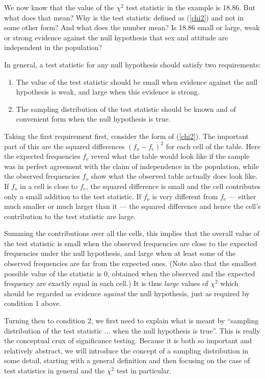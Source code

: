 We now know that the value of the $\chi^{2}$ test statistic in the
example is 18.86. But what does that mean? Why is the test statistic
defined as (\ref{chi2}) and not in some other form? And what does the
number mean? Is 18.86 small or large, weak or strong evidence against
the null hypothesis that sex and attitude are independent in the
population?

In general, a test
statistic for any null hypothesis should satisfy two
requirements:\label{p_2reqs}
\begin{enumerate}
\item
The value of the test statistic should be small when evidence against
the null hypothesis is weak, and large when this evidence is strong.
\item
The sampling distribution of the test statistic should be known and of
convenient form when the null hypothesis is true.
\end{enumerate}
Taking the first requirement first, consider the form of (\ref{chi2}).
The important part of this are the squared differences
$(f_{o}-f_{e})^{2}$ for each cell of the table. Here the expected
frequencies $f_{e}$ reveal what the table would look like if the
sample was in perfect agreement with the claim of independence in the
population, while the observed frequencies $f_{o}$ show what the
observed table actually does look like. If $f_{o}$ in a cell is close to
$f_{e}$, the squared difference is small and the cell contributes only a
small addition to the test statistic. If $f_{o}$ is
very different from $f_{e}$ --- either much smaller or much larger than
it --- the squared difference and hence the cell's contribution to the
test statistic are large.

Summing the contributions over all the cells, this implies that the
overall value of the test statistic is small when the observed
frequencies are close to the expected frequencies under the null
hypothesis, and large when at least some of the observed frequencies are
far from the expected ones. (Note also that the smallest possible value
of the statistic is 0, obtained when the observed and the expected
frequency are exactly equal in each cell.) It is thus \emph{large}
values of $\chi^{2}$ which should be regarded as evidence \emph{against}
the null hypothesis, just as required by condition 1 above.

Turning then to condition 2, we first need to explain what is meant by
``sampling distribution of the test statistic ... when the null
hypothesis is true''. This is really the conceptual crux of significance
testing. Because it is both so important and relatively abstract, we
will introduce the concept of a sampling distribution in some detail,
starting with a general definition and then focusing on the case of test
statistics in general and the $\chi^{2}$ test in particular.

